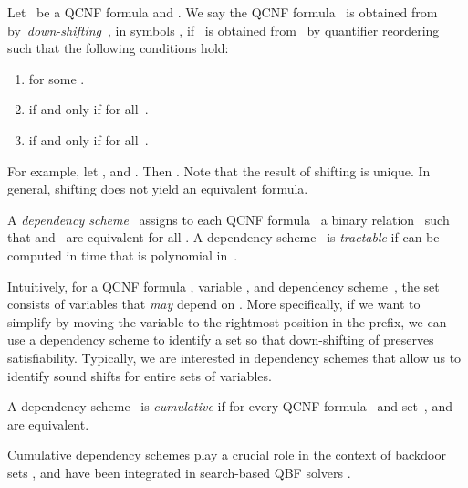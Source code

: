 \documentclass{llncs}
\def\hy{\hbox{-}\nobreak\hskip0pt} \newcommand{\ellipsis}{}
\begin{document}
\begin{definition}[Shifting]
  Let~ be a QCNF formula and . We say the QCNF
  formula~ is obtained from~ by~\emph{down-shifting}~, in
  symbols , if ~is obtained from~
  by quantifier reordering such that the following conditions hold:
  \begin{enumerate}
  \item  for some .
  \item  if and
    only if  for
    all~.
  \item  if and only if
     for all~.
  \end{enumerate}
\end{definition}
For example, let , and . Then . Note that the
result of shifting is unique. In general, shifting does not yield an
equivalent formula.
\begin{definition}
  A \emph{dependency scheme}~ assigns to each QCNF formula~ a binary
  relation~ such that 
  and~ are equivalent for all .  A dependency scheme~ is \emph{tractable} if  can
  be computed in time that is polynomial in~.
\end{definition}
Intuitively, for a QCNF formula , variable ,
and dependency scheme~, the set  consists of variables
that \emph{may} depend on . More specifically, if we want to
simplify  by moving the variable  to the rightmost position
in the prefix, we can use a dependency scheme to identify a set  so
that down-shifting of  preserves
satisfiability. Typically, we are interested in dependency schemes
that allow us to identify sound shifts for entire sets of variables.
\begin{definition}[Cumulative]
  \label{defn:cumul}
  A dependency scheme~ is \emph{cumulative} if for every QCNF
  formula~ and set~,
   and~
  are equivalent.
\end{definition}
Cumulative dependency schemes play a crucial role in the context of
backdoor sets \cite{SamerSzeider09a}, and have been integrated in
search\hy based QBF solvers \cite{LonsingBiere2010}.
\end{document}
